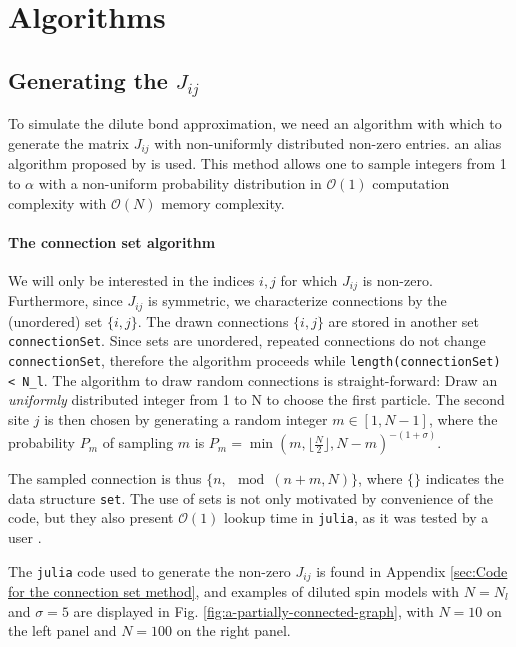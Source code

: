 \section{Algorithms}

\subsection{Generating the $J_{ij}$}

To simulate the dilute bond approximation, we need an algorithm with which to generate the matrix $J_{ij}$ with non-uniformly distributed non-zero entries.
an alias algorithm proposed by \cite{Walker1974} is used. This method allows one to sample integers from 1 to $\alpha$ with a non-uniform probability distribution in $\mathcal{O}(1)$ computation complexity with $\mathcal{O}(N)$ memory complexity. 

\paragraph{The connection set algorithm}%
\label{sub:The connection set algorithm}

We will only be interested in the indices $i, j$ for which  $J_{ij}$ is non-zero. Furthermore, since $J_{ij}$ is symmetric, we characterize connections by the (unordered) set $\{i, j\}$.
The drawn connections $\{ i, j \} $ are stored in another set \texttt{connectionSet}. Since sets are unordered, repeated connections do not change \texttt{connectionSet}, therefore the algorithm proceeds while \texttt{length(connectionSet) < N\_l}. The algorithm to draw random connections is straight-forward: Draw an \textit{uniformly} distributed integer from 1 to N to choose the first particle. The second site $j$ is then chosen by generating a random integer $m \in [1, N-1]$, where the probability $P_m$ of sampling $m$ is  $P_m = \min(m, \lfloor\frac{N}{2}\rfloor, N - m)^{-(1+\sigma)}$. 

The sampled connection is thus $\{n, \mod(n+m, N)\}$, where $\{\}$ indicates the data structure \texttt{set}. 
The use of sets is not only motivated by convenience of the code, but they also present $\mathcal{O}(1)$ lookup time in \texttt{julia}, as it was tested by a user \cite{setTime}.

The \texttt{julia} code used to generate the non-zero $J_{ij}$ is found in Appendix \ref{sec:Code for the connection set method}, and examples of diluted spin models with $N=N_l$ and $\sigma = 5$ are displayed in Fig. \ref{fig:a-partially-connected-graph}, with $N=10$ on the left panel and $N=100$ on the right panel.


